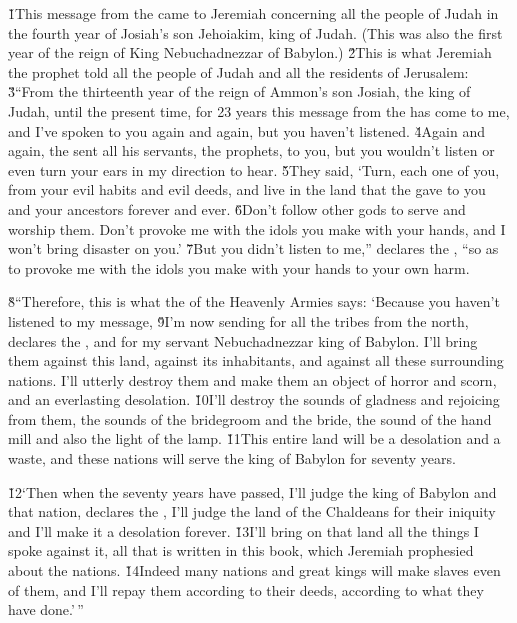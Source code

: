 \v{1}This message from the  came to Jeremiah concerning all the people of Judah in the fourth year of Josiah's son Jehoiakim, king of Judah. (This was also the first year of the reign of King Nebuchadnezzar of Babylon.) \v{2}This is what Jeremiah the prophet told all the people of Judah and all the residents of Jerusalem: \v{3}``From the thirteenth year of the reign of Ammon's son Josiah, the king of Judah, until the present time, for 23 years this message from the  has come to me, and I've spoken to you again and again, but you haven't listened. \v{4}Again and again, the  sent all his servants, the prophets, to you, but you wouldn't listen or even turn your ears in my direction to hear. \v{5}They said, `Turn, each one of you, from your evil habits and evil deeds, and live in the land that the  gave to you and your ancestors forever and ever. \v{6}Don't follow other gods to serve and worship them. Don't provoke me with the idols you make with your hands, and I won't bring disaster on you.' \v{7}But you didn't listen to me,'' declares the , ``so as to provoke me with the idols you make with your hands to your own harm.

\v{8}``Therefore, this is what the  of the Heavenly Armies says: `Because you haven't listened to my message, \v{9}I'm now sending for all the tribes from the north, declares the , and for my servant Nebuchadnezzar king of Babylon. I'll bring them against this land, against its inhabitants, and against all these surrounding nations. I'll utterly destroy them and make them an object of horror and scorn, and an everlasting desolation. \v{10}I'll destroy the sounds of gladness and rejoicing from them, the sounds of the bridegroom and the bride, the sound of the hand mill and also the light of the lamp. \v{11}This entire land will be a desolation and a waste, and these nations will serve the king of Babylon for seventy years.

\v{12}`Then when the seventy years have passed, I'll judge the king of Babylon and that nation, declares the , I'll judge the land of the Chaldeans for their iniquity and I'll make it a desolation forever. \v{13}I'll bring on that land all the things I spoke against it, all that is written in this book, which Jeremiah prophesied about the nations. \v{14}Indeed many nations and great kings will make slaves even of them, and I'll repay them according to their deeds, according to what they have done.'\,''

